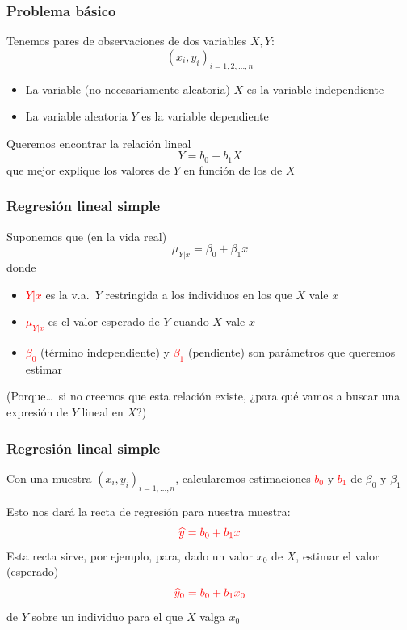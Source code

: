 \documentclass[12pt,t]{beamer}
\newcommand{\red}[1]{\textcolor{red}{#1}}
\renewcommand{\emph}[1]{{\color{red}#1}}
\theoremstyle{plain}
\theoremstyle{definition}
\begin{document}
\begin{frame}
\frametitle{Problema básico}

Tenemos pares de observaciones de dos variables $X,Y$:
$$
(x_i,y_i)_{i=1,2,\ldots,n}
$$

\begin{itemize}
\item La variable (no necesariamente aleatoria) $X$ es la variable  \emph{independiente}

\item La variable aleatoria $Y$ es la variable \emph{dependiente}
\end{itemize}
\medskip

Queremos encontrar la \emph{relación lineal}  
$$
Y=b_0+b_1X
$$
que mejor explique los valores de $Y$ en función de  los de $X$
\end{frame}

\begin{frame}
\frametitle{Regresión lineal simple}

Suponemos que (en la vida real)
$$
\mu_{Y|x}=\beta_0+\beta_1 x
$$
donde
\begin{itemize}
\item \red{$Y|x$} es la v.a.\ $Y$ restringida a los individuos en los que $X$ vale $x$\medskip

\item \red{$\mu_{Y|x}$} es el valor esperado de $Y$ cuando $X$ vale $x$\medskip

\item \red{$\beta_0$} (\emph{término independiente}) y \red{$\beta_1$} (\emph{pendiente}) son 
parámetros que queremos estimar 
\end{itemize}\bigskip

(Porque\ldots\ si no creemos que esta relación existe, ¿para qué vamos a buscar una expresión de $Y$ lineal en $X$?)

\end{frame}

\begin{frame}
\frametitle{Regresión lineal simple}

Con una muestra $(x_i,y_i)_{i=1,\ldots,n}$, calcularemos estimaciones \red{$b_0$} y \red{$b_1$} de $\beta_0$
y  $\beta_1$
\medskip

Esto nos dará la \emph{recta de regresión} para nuestra muestra:
$$
\red{\widehat{y}=b_0+b_1 x}
$$
Esta recta sirve, por ejemplo, para, dado un valor $x_0$ de $X$, estimar el valor (esperado) 
$$
\red{\widehat{y}_0=b_0+b_1 x_0}
$$ 
de $Y$ sobre un individuo para el que $X$ valga $x_0$
\end{frame}
\end{document}
